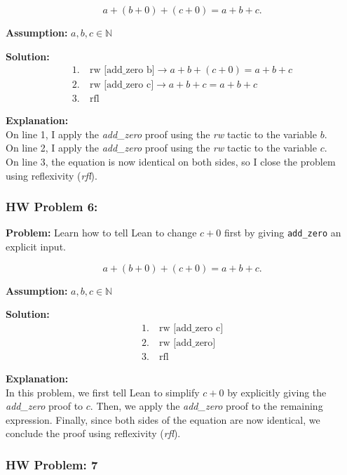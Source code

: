 \documentclass{article}
\theoremstyle{theorem}
\theoremstyle{definition}
\theoremstyle{remark}
\begin{document}
\[ a + (b + 0) + (c + 0) = a + b + c. \]

\textbf{Assumption:} \( a, b, c \in \mathbb{N} \)

\textbf{Solution:}
\begin{align*}
1. &\ \text{rw [add\_zero b]}  \rightarrow  a + b + (c + 0) = a + b + c \\
2. &\ \text{rw [add\_zero c]}  \rightarrow  a + b + c = a + b + c \\
3. &\ \text{rfl}
\end{align*}

\textbf{Explanation:}\\
On line 1, I apply the \emph{add\_zero} proof using the \emph{rw} tactic to the variable \( b \).\\
On line 2, I apply the \emph{add\_zero} proof using the \emph{rw} tactic to the variable \( c \).\\
On line 3, the equation is now identical on both sides, so I close the problem using reflexivity (\emph{rfl}).


\subsubsection{HW Problem 6:}

\textbf{Problem:} Learn how to tell Lean to change \( c + 0 \) first by giving \texttt{add\_zero} an explicit input.

\[ a + (b + 0) + (c + 0) = a + b + c. \]

\textbf{Assumption:} \( a, b, c \in \mathbb{N} \)

\textbf{Solution:}
\begin{align*}
1. &\ \text{rw [add\_zero c]} \\
2. &\ \text{rw [add\_zero]} \\
3. &\ \text{rfl}
\end{align*}

\textbf{Explanation:} \\
In this problem, we first tell Lean to simplify \( c + 0 \) by explicitly giving the \emph{add\_zero} proof to \( c \). Then, we apply the \emph{add\_zero} proof to the remaining expression. Finally, since both sides of the equation are now identical, we conclude the proof using reflexivity (\emph{rfl}).

\subsubsection{HW Problem: 7}
\end{document}
